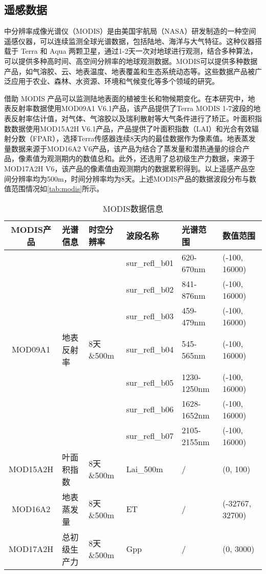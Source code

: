 \subsection{遥感数据}
\par 中分辨率成像光谱仪（MODIS）是由美国宇航局（NASA）研发制造的一种空间遥感仪器，可以连续监测全球光谱数据，包括陆地、海洋与大气特征。这种仪器搭载于 Terra 和 Aqua 两颗卫星，通过1-2天一次对地球进行观测，结合多种算法，可以提供多种高时间、高空间分辨率的地球观测数据。MODIS可以提供多种数据产品，如气溶胶、云、地表温度、地表覆盖和生态系统动态等。这些数据产品被广泛应用于农业、森林、水资源、环境和气候变化等多个领域的研究。

\par 借助 MODIS 产品可以监测陆地表面的植被生长和物候期变化。在本研究中，地表反射率数据使用MOD09A1 V6.1产品，该产品提供了Terra MODIS 1-7波段的地表反射率估计值，对气体、气溶胶以及瑞利散射等大气条件进行了矫正。叶面积指数数据使用MOD15A2H V6.1产品，产品提供了叶面积指数（LAI）和光合有效辐射分数（FPAR），选择Terra传感器连续8天内的最佳数据作为像素值。地表蒸发量数据来源于MOD16A2 V6产品，该产品为结合了蒸发量和潜热通量的综合产品，像素值为观测期内的数值总和。此外，还选用了总初级生产力数据，来源于MOD17A2H V6，该产品的像素值由观测期内的数据累积得到。以上遥感产品空间分辨率均为500m，时间分辨率均为8天。上述MODIS产品的数据波段分布与数值范围情况如\autoref{tab:modis}所示。

\begin{table}
  \centering
  \caption{MODIS数据信息}
  \label{tab:modis}
  \begin{tabularx}{\linewidth}{cX<{\centering}X<{\centering}X<{\centering}X<{\centering}X<{\centering}}
      \toprule
      MODIS产品 & 光谱信息 & 时空分辨率 & 波段名称 & 光谱范围 & 数值范围 \\
      \midrule
      & & & sur\_refl\_b01 & 620-670nm & (-100, 16000) \\
      & & & sur\_refl\_b02 & 841-876nm & (-100, 16000) \\
      & & & sur\_refl\_b03 & 459-479nm & (-100, 16000) \\
      MOD09A1 & 地表反射率 & 8天\&500m & sur\_refl\_b04 & 545-565nm & (-100, 16000) \\
      & & & sur\_refl\_b05 & 1230-1250nm & (-100, 16000) \\
      & & & sur\_refl\_b06 & 1628-1652nm & (-100, 16000) \\
      & & & sur\_refl\_b07 & 2105-2155nm & (-100, 16000) \\ \hline
      MOD15A2H  & 叶面积指数 & 8天\&500m & Lai\_500m & / & (0, 100) \\ \hline
      MOD16A2   & 地表蒸发量 & 8天\&500m & ET & / & (-32767, 32700) \\ \hline
      MOD17A2H  & 总初级生产力 & 8天\&500m & Gpp & / & (0, 3000) \\
      \bottomrule
  \end{tabularx}
\end{table}

